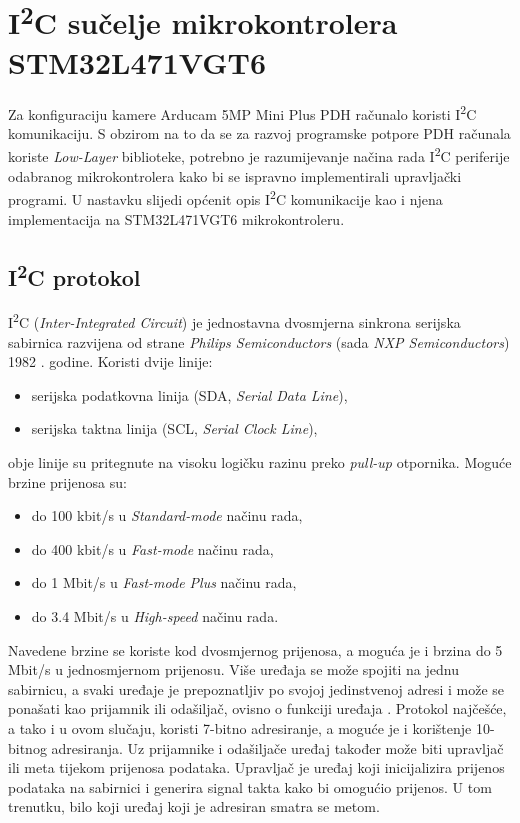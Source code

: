 \chapter{I\textsuperscript{2}C sučelje mikrokontrolera STM32L471VGT6}
Za konfiguraciju kamere Arducam 5MP Mini Plus  PDH računalo koristi I\textsuperscript{2}C komunikaciju. S obzirom na to da se za razvoj programske potpore PDH računala koriste \textit{Low-Layer} biblioteke, potrebno je razumijevanje načina rada I\textsuperscript{2}C periferije odabranog mikrokontrolera kako bi se ispravno implementirali upravljački programi. U nastavku slijedi općenit opis I\textsuperscript{2}C komunikacije kao i njena implementacija na STM32L471VGT6 mikrokontroleru.

\section{I\textsuperscript{2}C protokol}
I\textsuperscript{2}C (\textit{Inter-Integrated Circuit}) je jednostavna dvosmjerna sinkrona serijska sabirnica razvijena od strane \textit{Philips Semiconductors} (sada \textit{NXP Semiconductors}) 1982 \cite{i2c_wikipedia}. godine. Koristi dvije linije:
\begin{itemize}
	\item serijska podatkovna linija (SDA, \textit{Serial Data Line}),
	\item serijska taktna linija (SCL, \textit{Serial Clock Line}),
\end{itemize}
obje linije su pritegnute na visoku logičku razinu preko \textit{pull-up} otpornika. Moguće brzine prijenosa su:
\begin{itemize}
	\item do 100 \si{kbit/s} u \textit{Standard-mode} načinu rada, 
	\item do 400 \si{kbit/s} u \textit{Fast-mode} načinu rada,
	\item do 1 \si{Mbit/s} u \textit{Fast-mode Plus} načinu rada,
	\item do 3.4 \si{Mbit/s} u \textit{High-speed} načinu rada.
\end{itemize}
Navedene brzine se koriste kod dvosmjernog prijenosa, a moguća je i brzina do 5 \si{Mbit/s} u jednosmjernom prijenosu. Više uređaja se može spojiti na jednu sabirnicu, a svaki uređaje je prepoznatljiv po svojoj jedinstvenoj adresi i može se ponašati kao prijamnik ili odašiljač, ovisno o funkciji uređaja \cite{i2c_manual}. Protokol najčešće, a tako i u ovom slučaju, koristi 7-bitno adresiranje, a moguće je i korištenje 10-bitnog adresiranja. Uz prijamnike i odašiljače uređaj također može biti upravljač ili meta tijekom prijenosa podataka. Upravljač je uređaj koji inicijalizira prijenos podataka na sabirnici i generira signal takta kako bi omogućio prijenos. U tom trenutku, bilo koji uređaj koji je adresiran smatra se metom.


